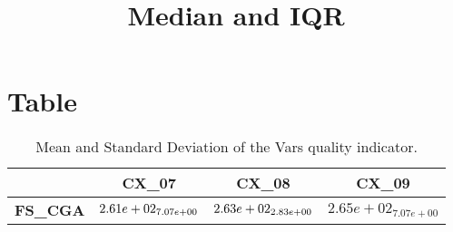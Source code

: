 \documentclass{article}
\title{Median and IQR}
\author{}
\begin{document}
\maketitle
\section{Table}
\begin{table}[!htp]
  \caption{Mean and Standard Deviation of the Vars quality indicator.}
  \label{table:Vars}
  \centering
  \begin{scriptsize}
  \begin{tabular}{c|ccc}
      & \textbf{CX\_07} & \textbf{CX\_08} & \textbf{CX\_09} \\\hline
      \textbf{FS_CGA} & $\cellcolor{gray25} 2.61e+02_{7.07e+00} $ & $ \cellcolor{gray95} 2.63e+02_{2.83e+00} $ & $ 2.65e+02_{7.07e+00}$ \\
  \end{tabular}
  \end{scriptsize}
\end{table}
\end{document}
